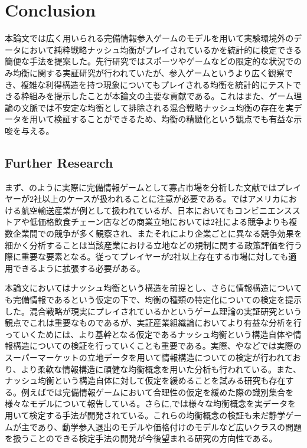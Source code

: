 \documentclass{jsarticle}
\begin{document}
\section{Conclusion}
本論文では広く用いられる完備情報参入ゲームのモデルを用いて実験環境外のデータにおいて純粋戦略ナッシュ均衡がプレイされているかを統計的に検定できる簡便な手法を提案した。先行研究ではスポーツやゲームなどの限定的な状況でのみ均衡に関する実証研究が行われていたが、参入ゲームというより広く観察でき、複雑な利得構造を持つ現象についてもプレイされる均衡を統計的にテストできる枠組みを提示したことが本論文の主要な貢献である。これはまた、ゲーム理論の文脈では不安定な均衡として排除される混合戦略ナッシュ均衡の存在を実データを用いて検証することができるため、均衡の精緻化という観点でも有益な示唆を与える。

\subsection{Further Research}
まず、\cite{Ciliberto2009a}のように実際に完備情報ゲームとして寡占市場を分析した文献ではプレイヤーが$2$社以上のケースが扱われることに注意が必要である。\cite{Ciliberto2009a}ではアメリカにおける航空輸送産業が例として扱われているが、日本においてもコンビニエンスストアや低価格飲食チェーン店などの商業立地においては$2$社による競争よりも複数企業間での競争が多く観察され、またそれにより企業ごとに異なる競争効果を細かく分析することは当該産業における立地などの規制に関する政策評価を行う際に重要な要素となる。従ってプレイヤーが$2$社以上存在する市場に対しても適用できるように拡張する必要がある。

本論文においてはナッシュ均衡という構造を前提とし、さらに情報構造についても完備情報であるという仮定の下で、均衡の種類の特定化についての検定を提示した。混合戦略が現実にプレイされているかというゲーム理論の実証研究という観点でこれは重要なものであるが、実証産業組織論においてより有益な分析を行っていくためには、より基幹となる仮定であるナッシュ均衡という構造自体や情報構造についての検証を行っていくことも重要である。実際、\cite{Grieco2014a}や\cite{Magnolfi2015}などでは実際のスーパーマーケットの立地データを用いて情報構造についての検定が行われており、より柔軟な情報構造に頑健な均衡概念を用いた分析も行われている。また、ナッシュ均衡という構造自体に対して仮定を緩めることを試みる研究も存在する。例えば\cite{Aradillas-Lopez2008}では完備情報ゲームにおいて合理性の仮定を緩めた際の識別集合を様々なモデルについて報告している。さらに\cite{Kashaev2017},\cite{Kashaev2016}では様々な均衡概念を実データを用いて検定する手法が開発されている。これらの均衡概念の検証も未だ静学ゲームが主であり、動学参入退出のモデルや価格付けのモデルなど広いクラスの問題を扱うことのできる検定手法の開発が今後望まれる研究の方向性である。
\end{document}
